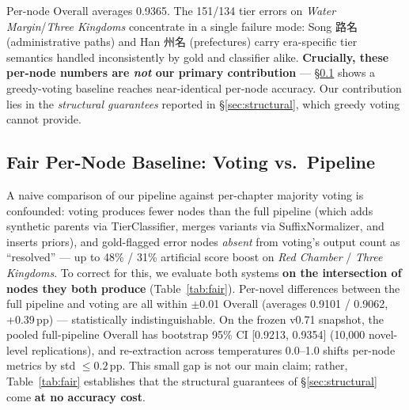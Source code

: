 \documentclass[11pt]{article}
\newenvironment{CJK}[2]{}{}
\begin{document}
Per-node Overall averages 0.9365. The 151/134 tier errors on \textit{Water Margin}/\textit{Three Kingdoms} concentrate in a single failure mode: Song \begin{CJK}{UTF8}{gbsn}路名\end{CJK} (administrative paths) and Han \begin{CJK}{UTF8}{gbsn}州名\end{CJK} (prefectures) carry era-specific tier semantics handled inconsistently by gold and classifier alike. \textbf{Crucially, these per-node numbers are \emph{not} our primary contribution} --- §\ref{sec:fair-baseline} shows a greedy-voting baseline reaches near-identical per-node accuracy. Our contribution lies in the \emph{structural guarantees} reported in §\ref{sec:structural}, which greedy voting cannot provide.

\subsection{Fair Per-Node Baseline: Voting vs.\ Pipeline}
\label{sec:fair-baseline}

A naive comparison of our pipeline against per-chapter majority voting is confounded: voting produces fewer nodes than the full pipeline (which adds synthetic parents via TierClassifier, merges variants via SuffixNormalizer, and inserts priors), and gold-flagged error nodes \textit{absent} from voting's output count as ``resolved'' --- up to 48\% / 31\% artificial score boost on \textit{Red Chamber} / \textit{Three Kingdoms}. To correct for this, we evaluate both systems \textbf{on the intersection of nodes they both produce} (Table~\ref{tab:fair}). Per-novel differences between the full pipeline and voting are all within $\pm$0.01 Overall (averages 0.9101 / 0.9062, +0.39\,pp) --- statistically indistinguishable. On the frozen v0.71 snapshot, the pooled full-pipeline Overall has bootstrap 95\% CI [0.9213, 0.9354] (10{,}000 novel-level replications), and re-extraction across temperatures 0.0--1.0 shifts per-node metrics by std $\leq 0.2$\,pp. This small gap is not our main claim; rather, Table~\ref{tab:fair} establishes that the structural guarantees of \S\ref{sec:structural} come \textbf{at no accuracy cost}.
\end{document}
